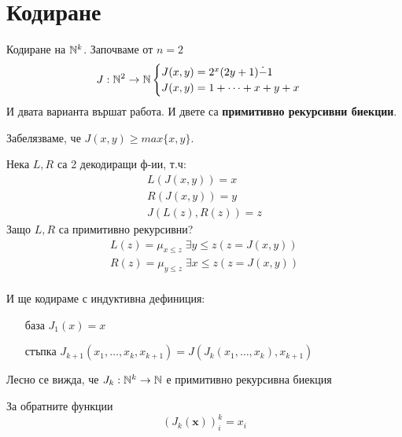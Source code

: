 \section{Кодиране}
Кодиране на ${\mathbb{N}}^k$. Започваме от $n=2$
\begin{equation}
    J: {\mathbb{N}}^2 \to {\mathbb{N}}
    \begin{cases}
        J(x, y) = 2^x(2y+1) \dot{-} 1 \\
        J(x, y) = 1 + \dots + x + y + x
    \end{cases}
\end{equation}
И двата варианта вършат работа. И двете са \textbf{примитивно рекурсивни биекции}.

Забелязваме, че $J(x, y) \geq max\{x, y\}$.

Нека $L, R$ са 2 декодиращи ф-ии, т.ч:
\begin{equation}
    \begin{split}
    L(J(x,y)) = x \\
    R(J(x,y)) = y \\
    J(L(z), R(z)) = z
\end{split}
\end{equation}
Защо $L, R$ са примитивно рекурсивни?
\begin{equation}
    \begin{split}
        L(z) = \mu_{x \leq z}\; \exists y \leq z (z = J(x,y)) \\
        R(z) = \mu_{y \leq z}\; \exists x \leq z (z = J(x,y)) \\
    \end{split}
\end{equation}

И ще кодираме с индуктивна дефиниция:
\begin{itemize}
    \item[база] $J_1(x) = x$
    \item[стъпка] $J_{k+1}(x_1, \dots, x_k, x_{k+1}) = J(J_k(x_1, \dots, x_k), x_{k+1})$
\end{itemize}
Лесно се вижда, че $J_k : {\mathbb{N}}^k \to {\mathbb{N}}$ е примитивно рекурсивна биекция

За обратните функции
\begin{equation*}
    (J_k(\textbf{x}))_i^k = x_i
\end{equation*}

